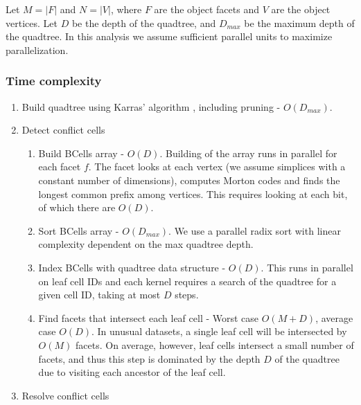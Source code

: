 \documentclass[final,3p,times,twocolumn]{elsarticle}
\begin{document}
Let $M = |F|$ and $N = |V|$, where $F$ are the object facets and $V$ are the object vertices. Let $D$ be the depth of the quadtree, and $D_{max}$ be the maximum depth of the quadtree. In this analysis we assume sufficient parallel units to maximize parallelization.

\subsubsection{Time complexity}

\begin{enumerate}
\item Build quadtree using Karras' algorithm \cite{karras2012maximizing}, including pruning - $O(D_{max})$.
\item Detect conflict cells
  \begin{enumerate}
  \item Build BCells array - $O(D)$. Building of the array runs in parallel for each facet $f$. The facet looks at each vertex (we assume simplices with a constant number of dimensions), computes Morton codes and finds the longest common prefix among vertices. This requires looking at each bit, of which there are $O(D)$.
  \item Sort BCells array - $O(D_{max})$. We use a parallel radix sort with linear complexity dependent on the max quadtree depth.
  \item Index BCells with quadtree data structure - $O(D)$. This runs in parallel on leaf cell IDs and each kernel requires a search of the quadtree for a given cell ID, taking at most $D$ steps.
  \item Find facets that intersect each leaf cell - Worst case $O(M+D)$, average case $O(D)$. In unusual datasets, a single leaf cell will be intersected by $O(M)$ facets. On average, however, leaf cells intersect a small number of facets, and thus this step is dominated by the depth $D$ of the quadtree due to visiting each ancestor of the leaf cell.
  \end{enumerate}
\item Resolve conflict cells

\end{enumerate}
\end{document}
